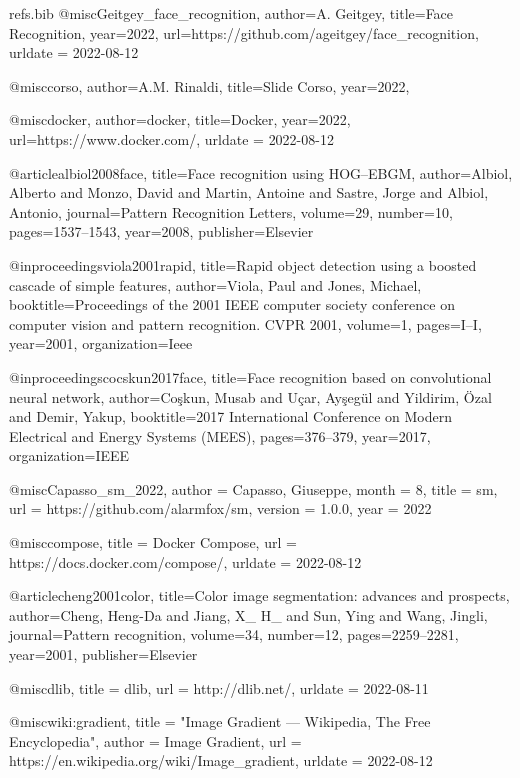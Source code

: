 \begin{filecontents*}[overwrite]{refs.bib}
@misc{Geitgey_face_recognition,
  author={A. Geitgey},
  title={Face Recognition},
  year={2022},
  url={{https://github.com/ageitgey/face\_recognition}},
  urldate = {2022-08-12}
}

@misc{corso,
  author={A.M. Rinaldi},
  title={Slide Corso},
  year={2022},
}

@misc{docker,
  author={docker},
  title={Docker},
  year={2022},
  url={{https://www.docker.com/}},
  urldate = {2022-08-12}
}

@article{albiol2008face,
  title={Face recognition using HOG--EBGM},
  author={Albiol, Alberto and Monzo, David and Martin, Antoine and Sastre, Jorge and Albiol, Antonio},
  journal={Pattern Recognition Letters},
  volume={29},
  number={10},
  pages={1537--1543},
  year={2008},
  publisher={Elsevier}
}

@inproceedings{viola2001rapid,
  title={Rapid object detection using a boosted cascade of simple features},
  author={Viola, Paul and Jones, Michael},
  booktitle={Proceedings of the 2001 IEEE computer society conference on computer vision and pattern recognition. CVPR 2001},
  volume={1},
  pages={I--I},
  year={2001},
  organization={Ieee}
}

@inproceedings{cocskun2017face,
  title={Face recognition based on convolutional neural network},
  author={Co{\c{s}}kun, Musab and U{\c{c}}ar, Ay{\c{s}}eg{\"u}l and Yildirim, {\"O}zal and Demir, Yakup},
  booktitle={2017 International Conference on Modern Electrical and Energy Systems (MEES)},
  pages={376--379},
  year={2017},
  organization={IEEE}
}

@misc{Capasso_sm_2022,
  author = {Capasso, Giuseppe},
  month = {8},
  title = {{sm}},
  url = {https://github.com/alarmfox/sm},
  version = {1.0.0},
  year = {2022}
}

@misc{compose,
  title = {{Docker Compose}},
  url = {https://docs.docker.com/compose/},
  urldate = {2022-08-12}
}

@article{cheng2001color,
  title={Color image segmentation: advances and prospects},
  author={Cheng, Heng-Da and Jiang, X\_ H\_ and Sun, Ying and Wang, Jingli},
  journal={Pattern recognition},
  volume={34},
  number={12},
  pages={2259--2281},
  year={2001},
  publisher={Elsevier}
}

@misc{dlib,
  title = {dlib},
  url = {http://dlib.net/},
  urldate = {2022-08-11}
}

@misc{wiki:gradient,
  title = "Image Gradient --- {W}ikipedia{,} The Free Encyclopedia",
  author = {{Image Gradient}},
  url = {https://en.wikipedia.org/wiki/Image\_gradient},
  urldate = {2022-08-12}
}


\end{filecontents*}
